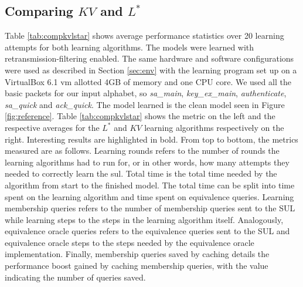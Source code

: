 \subsection{Comparing $KV$ and $L^*$} \label{subsec:comp_kv_lstar}
Table \ref{tab:compkvlstar} shows average performance statistics over 20 learning attempts for both learning algorithms. The models were learned with retransmission-filtering enabled. The same hardware and software configurations were used as described in Section \ref{sec:env} with the learning program set up on a VirtualBox 6.1 \ac{vm} allotted 4GB of memory and one CPU core. We used all the basic packets for our input alphabet, so
\emph{sa\_main}, \emph{key\_ex\_main}, \emph{authenticate}, \emph{sa\_quick} and \emph{ack\_quick}. The model learned is the clean model seen in Figure \ref{fig:reference}. Table \ref{tab:compkvlstar} shows the metric on the left and the respective averages for the $L^*$ and $KV$ learning algorithms respectively on the right. Interesting results are highlighted in bold. From top to bottom, the metrics measured are as follows. Learning rounds refers to the number of rounds the learning algorithms had to run for, or in other words, how many attempts they needed to correctly learn the \ac{sul}. Total time is the total time needed by the algorithm from start to the finished model. The total time can be split into time spent on the learning algorithm and time spent on equivalence queries. Learning membership queries refers to the number of membership queries sent to the SUL while learning steps to the steps in the learning algorithm itself. Analogously, equivalence oracle queries refers to the equivalence queries sent to the SUL and equivalence oracle steps to the steps needed by the equivalence oracle implementation. Finally, membership queries saved by caching details the performance boost gained by caching membership queries, with the value indicating the number of queries saved.

